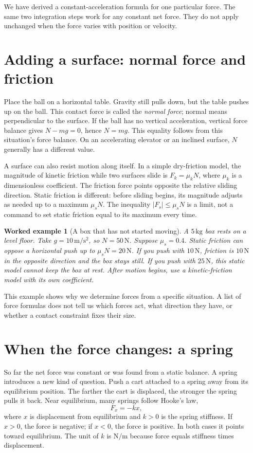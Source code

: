 \documentclass[11pt,oneside]{book}
\theoremstyle{reviewstyle}
\newtheorem{example}{Worked example}[chapter]
\begin{document}
We have derived a constant-acceleration formula for one particular force. The same two integration steps work for any constant net force. They do not apply unchanged when the force varies with position or velocity.

\section{Adding a surface: normal force and friction}
Place the ball on a horizontal table. Gravity still pulls down, but the table pushes up on the ball. This contact force is called the \emph{normal force}; normal means perpendicular to the surface. If the ball has no vertical acceleration, vertical force balance gives $N-mg=0$, hence $N=mg$. This equality follows from this situation's force balance. On an accelerating elevator or an inclined surface, $N$ generally has a different value.

A surface can also resist motion along itself. In a simple dry-friction model, the magnitude of kinetic friction while two surfaces slide is $F_k=\mu_kN$, where $\mu_k$ is a dimensionless coefficient. The friction force points opposite the relative sliding direction. Static friction is different: before sliding begins, its magnitude adjusts as needed up to a maximum $\mu_sN$. The inequality $|F_s|\leq\mu_sN$ is a limit, not a command to set static friction equal to its maximum every time.

\begin{example}[A box that has not started moving]
A $5\,\mathrm{kg}$ box rests on a level floor. Take $g=10\,\mathrm{m/s^2}$, so $N=50\,\mathrm N$. Suppose $\mu_s=0.4$. Static friction can oppose a horizontal push up to $\mu_sN=20\,\mathrm N$. If you push with $10\,\mathrm N$, friction is $10\,\mathrm N$ in the opposite direction and the box stays still. If you push with $25\,\mathrm N$, this static model cannot keep the box at rest. After motion begins, use a kinetic-friction model with its own coefficient.
\end{example}

This example shows why we determine forces from a specific situation. A list of force formulas does not tell us which forces act, what direction they have, or whether a contact constraint fixes their size.

\section{When the force changes: a spring}
So far the net force was constant or was found from a static balance. A spring introduces a new kind of question. Push a cart attached to a spring away from its equilibrium position. The farther the cart is displaced, the stronger the spring pulls it back. Near equilibrium, many springs follow Hooke's law,
\begin{equation}
F_x=-kx,
\end{equation}
where $x$ is displacement from equilibrium and $k>0$ is the spring stiffness. If $x>0$, the force is negative; if $x<0$, the force is positive. In both cases it points toward equilibrium. The unit of $k$ is $\mathrm{N/m}$ because force equals stiffness times displacement.
\end{document}
